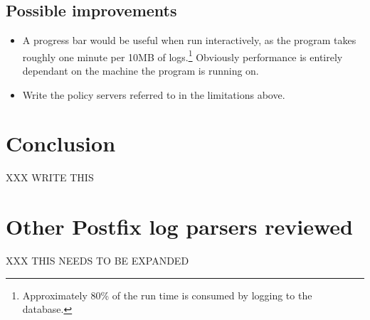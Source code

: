 \documentclass[a4paper,12pt,draft]{article}
\begin{document}
\subsection{Possible improvements}

\begin{itemize}

    \item A progress bar would be useful when run interactively, as the
        program takes roughly one minute per 10MB of
        logs.\footnote{Approximately 80\% of the run time is consumed by
        logging to the database.}  Obviously performance is entirely
        dependant on the machine the program is running on.

    \item Write the policy servers referred to in the limitations above.

\end{itemize}

\section{Conclusion}

\label{conclusion}

XXX WRITE THIS


\appendix


\section{Other Postfix log parsers reviewed}

XXX THIS NEEDS TO BE EXPANDED

\label{other-parsers}
\end{document}
